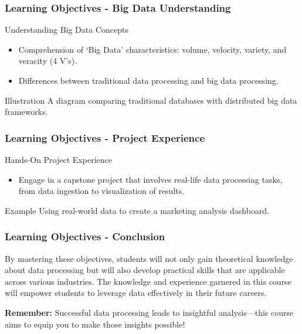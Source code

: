 \documentclass[aspectratio=169]{beamer}
\begin{document}
\begin{frame}[fragile]
\frametitle{Learning Objectives - Big Data Understanding}
\begin{block}{Understanding Big Data Concepts}
\begin{itemize}
    \item Comprehension of ‘Big Data’ characteristics: volume, velocity, variety, and veracity (4 V’s).
    \item Differences between traditional data processing and big data processing.
\end{itemize}
\end{block}
\begin{block}{Illustration}
A diagram comparing traditional databases with distributed big data frameworks.
\end{block}
\end{frame}

\begin{frame}[fragile]
\frametitle{Learning Objectives - Project Experience}
\begin{block}{Hands-On Project Experience}
\begin{itemize}
    \item Engage in a capstone project that involves real-life data processing tasks, from data ingestion to visualization of results.
\end{itemize}
\end{block}
\begin{block}{Example}
Using real-world data to create a marketing analysis dashboard.
\end{block}
\end{frame}

\begin{frame}[fragile]
\frametitle{Learning Objectives - Conclusion}
By mastering these objectives, students will not only gain theoretical knowledge about data processing but will also develop practical skills that are applicable across various industries. 
The knowledge and experience garnered in this course will empower students to leverage data effectively in their future careers.
    
\textbf{Remember:} Successful data processing leads to insightful analysis—this course aims to equip you to make those insights possible!
\end{frame}
\end{document}
